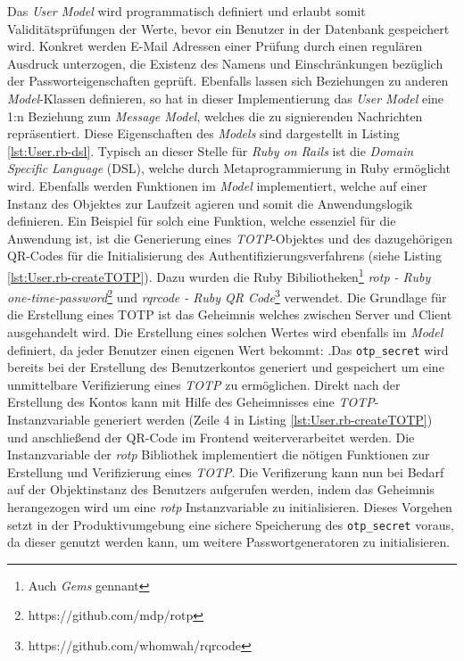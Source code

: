 \documentclass[11pt,a4paper,ngerman]{scrreprt}
\begin{document}
Das \textit{User Model} wird programmatisch definiert und erlaubt somit Validitätsprüfungen der Werte, bevor ein Benutzer in der Datenbank gespeichert wird. Konkret werden E-Mail Adressen einer Prüfung durch einen regulären Ausdruck unterzogen, die Existenz des Namens und Einschränkungen bezüglich der Passworteigenschaften geprüft. Ebenfalls lassen sich Beziehungen zu anderen \textit{Model}-Klassen definieren, so hat in dieser Implementierung das \textit{User Model} eine 1:n Beziehung zum \textit{Message Model}, welches die zu signierenden Nachrichten repräsentiert. Diese Eigenschaften des \textit{Models} sind dargestellt in Listing \ref{lst:User.rb-dsl}. Typisch an dieser Stelle für \textit{Ruby on Rails} ist die \textit{Domain Specific Language} (DSL), welche durch Metaprogrammierung in Ruby ermöglicht wird. Ebenfalls werden Funktionen im \textit{Model} implementiert, welche auf einer Instanz des Objektes zur Laufzeit agieren und somit die Anwendungslogik definieren. Ein Beispiel für solch eine Funktion, welche essenziel für die Anwendung ist, ist die Generierung eines \textit{TOTP}-Objektes und des dazugehörigen QR-Codes für die Initialisierung des Authentifizierungsverfahrens (siehe Listing \ref{lst:User.rb-createTOTP}). Dazu wurden die Ruby Bibiliotheken\footnote{Auch \textit{Gems} gennant} \textit{rotp - Ruby one-time-password}\footnote{https://github.com/mdp/rotp} und \textit{rqrcode - Ruby QR Code}\footnote{https://github.com/whomwah/rqrcode} verwendet. Die Grundlage für die Erstellung eines TOTP ist das Geheimnis welches zwischen Server und Client ausgehandelt wird. Die Erstellung eines solchen Wertes wird ebenfalls im \textit{Model} definiert, da jeder Benutzer einen eigenen Wert bekommt:  .Das \texttt{otp\_secret} wird bereits bei der Erstellung des Benutzerkontos generiert und gespeichert um eine unmittelbare Verifizierung eines \textit{TOTP} zu ermöglichen. Direkt nach der Erstellung des Kontos kann mit Hilfe des Geheimnisses eine \textit{TOTP}-Instanzvariable  generiert werden (Zeile 4 in Listing \ref{lst:User.rb-createTOTP}) und anschließend der QR-Code im Frontend weiterverarbeitet werden. Die Instanzvariable der \textit{rotp} Bibliothek implementiert die nötigen Funktionen zur Erstellung und Verifizierung eines \textit{TOTP}. Die Verifizerung kann nun bei Bedarf auf der Objektinstanz des Benutzers aufgerufen werden, indem das Geheimnis herangezogen wird um eine \textit{rotp} Instanzvariable zu initialisieren. Dieses Vorgehen setzt in der Produktivumgebung eine sichere Speicherung des \texttt{otp\_secret} voraus, da dieser genutzt werden kann, um weitere Passwortgeneratoren zu initialisieren.
\end{document}
